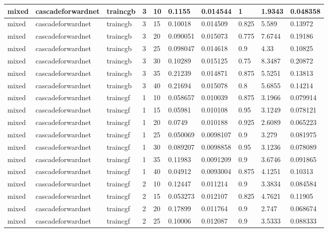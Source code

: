 \begin{longtable}{lllllllll}
mixed & cascadeforwardnet & traincgb & 3 & 10 & 0.1155 & 0.014544 & 1 & 1.9343 & 0.048358 \\ \hline 
mixed & cascadeforwardnet & traincgb & 3 & 15 & 0.10018 & 0.014509 & 0.825 & 5.589 & 0.13972 \\ \hline 
mixed & cascadeforwardnet & traincgb & 3 & 20 & 0.090051 & 0.015073 & 0.775 & 7.6744 & 0.19186 \\ \hline 
mixed & cascadeforwardnet & traincgb & 3 & 25 & 0.098047 & 0.014618 & 0.9 & 4.33 & 0.10825 \\ \hline 
mixed & cascadeforwardnet & traincgb & 3 & 30 & 0.10289 & 0.015125 & 0.75 & 8.3487 & 0.20872 \\ \hline 
mixed & cascadeforwardnet & traincgb & 3 & 35 & 0.21239 & 0.014871 & 0.875 & 5.5251 & 0.13813 \\ \hline 
mixed & cascadeforwardnet & traincgb & 3 & 40 & 0.21694 & 0.015078 & 0.8 & 5.6855 & 0.14214 \\ \hline 
mixed & cascadeforwardnet & traincgf & 1 & 10 & 0.058657 & 0.010039 & 0.875 & 3.1966 & 0.079914 \\ \hline 
mixed & cascadeforwardnet & traincgf & 1 & 15 & 0.05981 & 0.010108 & 0.95 & 3.1249 & 0.078121 \\ \hline 
mixed & cascadeforwardnet & traincgf & 1 & 20 & 0.0749 & 0.010188 & 0.925 & 2.6089 & 0.065223 \\ \hline 
mixed & cascadeforwardnet & traincgf & 1 & 25 & 0.050069 & 0.0098107 & 0.9 & 3.279 & 0.081975 \\ \hline 
mixed & cascadeforwardnet & traincgf & 1 & 30 & 0.089207 & 0.0098858 & 0.95 & 3.1236 & 0.078089 \\ \hline 
mixed & cascadeforwardnet & traincgf & 1 & 35 & 0.11983 & 0.0091209 & 0.9 & 3.6746 & 0.091865 \\ \hline 
mixed & cascadeforwardnet & traincgf & 1 & 40 & 0.04912 & 0.0093004 & 0.875 & 4.1251 & 0.10313 \\ \hline 
mixed & cascadeforwardnet & traincgf & 2 & 10 & 0.12447 & 0.011214 & 0.9 & 3.3834 & 0.084584 \\ \hline 
mixed & cascadeforwardnet & traincgf & 2 & 15 & 0.053273 & 0.012107 & 0.825 & 4.7621 & 0.11905 \\ \hline 
mixed & cascadeforwardnet & traincgf & 2 & 20 & 0.17899 & 0.011764 & 0.9 & 2.747 & 0.068674 \\ \hline 
mixed & cascadeforwardnet & traincgf & 2 & 25 & 0.10006 & 0.012087 & 0.9 & 3.5333 & 0.088333 \\ \hline 

\end{longtable}
